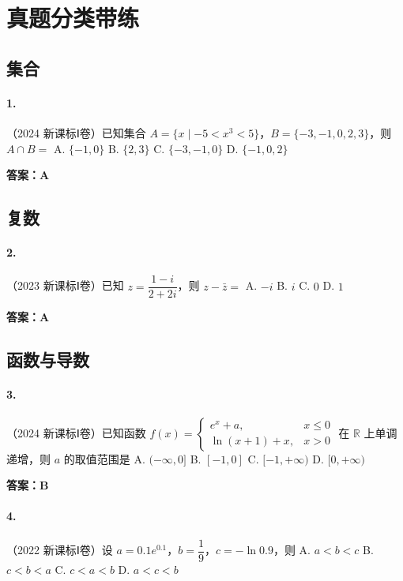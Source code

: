 \section{真题分类带练}

\subsection{集合}

\paragraph{1.}（2024 新课标Ⅰ卷）已知集合 $A = \{x \mid -5 < x^3 < 5\}$，$B = \{-3,-1,0,2,3\}$，则 $A \cap B =$
A. $\{-1,0\}$ \quad B. $\{2,3\}$ \quad C. $\{-3,-1,0\}$ \quad D. $\{-1,0,2\}$

\textbf{答案：A}

\subsection{复数}

\paragraph{2.}（2023 新课标Ⅰ卷）已知 $z = \dfrac{1-i}{2+2i}$，则 $z - \bar{z} =$
A. $-i$ \quad B. $i$ \quad C. $0$ \quad D. $1$

\textbf{答案：A}

\subsection{函数与导数}

\paragraph{3.}（2024 新课标Ⅰ卷）已知函数 $f(x) = \begin{cases} e^x + a, & x \le 0 \\ \ln(x+1) + x, & x > 0 \end{cases}$ 在 $\mathbb{R}$ 上单调递增，则 $a$ 的取值范围是
A. $(-\infty,0]$ \quad B. $[-1,0]$ \quad C. $[-1,+\infty)$ \quad D. $[0,+\infty)$

\textbf{答案：B}

\paragraph{4.}（2022 新课标Ⅰ卷）设 $a = 0.1e^{0.1}$，$b = \dfrac{1}{9}$，$c = -\ln 0.9$，则
A. $a < b < c$ \quad B. $c < b < a$ \quad C. $c < a < b$ \quad D. $a < c < b$

